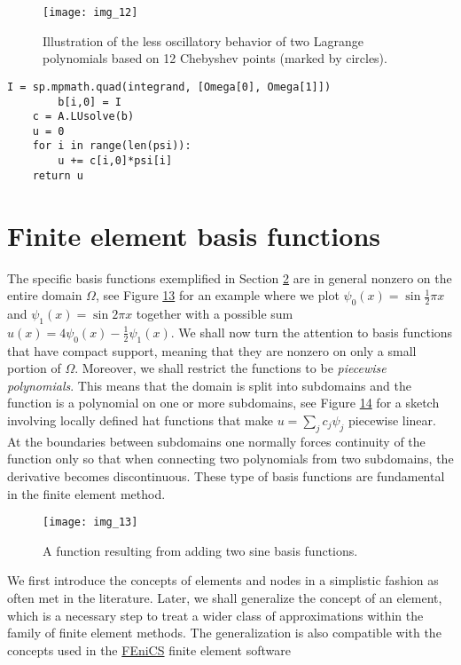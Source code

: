 \documentclass[../main.tex]{subfiles}
\begin{document}
\begin{figure}[H]
	\centering
	\texttt{[image: img\_12]}
	\caption{Illustration of the less oscillatory behavior of two Lagrange polynomials based on 12 Chebyshev points (marked by circles).}
	\label{fig:img_12}
\end{figure}
\begin{lstlisting}[numbers=none]
			I = sp.mpmath.quad(integrand, [Omega[0], Omega[1]])
		b[i,0] = I
	c = A.LUsolve(b)
	u = 0
	for i in range(len(psi)):
		u += c[i,0]*psi[i]
	return u
\end{lstlisting}

\chapter{Finite element basis functions}
\label{chap:chap_3}
\noindent The specific basis functions exemplified in Section \hyperref[chap:chap_2]{2} are in general nonzero on the entire domain $\Omega$, see Figure \hyperref[fig:img_13]{13} for an example where we plot $\psi_{0}(x)=\sin \frac{1}{2} \pi x$ and $\psi_{1}(x)=\sin 2 \pi x$ together with a possible sum $u(x)=4 \psi_{0}(x)-\frac{1}{2} \psi_{1}(x)$. We shall now turn the attention to basis functions that have compact support, meaning that they are nonzero on only a small portion of $\Omega$. Moreover, we shall restrict the functions to be \textit{piecewise polynomials}. This means that the domain is split into subdomains and the function is a polynomial on one or more subdomains, see Figure \hyperref[fig:img_14]{14} for a sketch involving locally defined hat functions that make $u=\sum_{j} c_{j} \psi_{j}$ piecewise linear. At the boundaries between subdomains one normally forces continuity of the function only so that when connecting two polynomials from two subdomains, the derivative becomes discontinuous. These type of basis functions are fundamental in the finite element method.
\begin{figure}[H]
	\centering
	\texttt{[image: img\_13]}
	\caption{A function resulting from adding two sine basis functions.}
	\label{fig:img_13}
\end{figure}
We first introduce the concepts of elements and nodes in a simplistic fashion
as often met in the literature. Later, we shall generalize the concept of an
element, which is a necessary step to treat a wider class of approximations within
the family of finite element methods. The generalization is also compatible with
the concepts used in the \href{https://fenicsproject.org/}{FEniCS} finite element software
\end{document}
